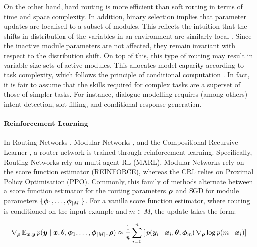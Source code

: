 \documentclass[10pt]{article} %
\begin{document}
On the other hand, hard routing is more efficient than soft routing in terms of time and space complexity. In addition, binary selection implies that parameter updates are localised to a subset of modules. This reflects the intuition that the shifts in distribution of the variables in an environment are similarly local \citep{parascandolo2018learning,goyal2019recurrent}. Since the inactive module parameters are not affected, they remain invariant with respect to the distribution shift.
On top of this, this type of routing may result in variable-size sets of active modules.
This allocates model capacity according to task complexity, which
follows the principle of conditional computation \citep{bengio2015conditional}. In fact, it is fair to assume that the skills required for complex tasks are a superset of those of simpler tasks. For instance, dialogue modelling requires (among others) intent detection, slot filling, and conditional response generation. 

\paragraph*{Reinforcement Learning}
In Routing Networks \citep{rosenbaum2017routing}, Modular Networks \citep{kirsch2018modular}, and the Compositional Recursive Learner \citep[CRL;][]{chang2018automatically}, a router network is trained through reinforcement learning. Specifically, Routing Networks rely on multi-agent RL (MARL), Modular Networks rely on the score function estimator (REINFORCE), whereas the CRL relies on Proximal Policy Optimisation (PPO). Commonly, this family of methods alternate between a score function estimator for the routing parameters ${\bm{\rho}}$ and SGD for module parameters $\{{\bm{\phi}}_1, \dots, {\bm{\phi}}_{|M|}\}$. For a vanilla score function estimator, where routing is conditioned on the input example and $m \in M$, the update takes the form:

\begin{equation}
\begin{aligned}
    \nabla_{\bm{\rho}} \, \mathbb{E}_{{\bm{x}}, {\bm{y}}} \, p({\bm{y}} \mid {\bm{x}}, {\bm{\theta}}, {\bm{\phi}}_1, \dots, {\bm{\phi}}_{|M|}, {\bm{\rho}}) \approx \frac{1}{n} \sum_{i=0}^n \left[ \, p({\bm{y}}_i \mid {\bm{x}}_i, {\bm{\theta}}, {\bm{\phi}}_m) \, \nabla_{\bm{\rho}} \log p(m \mid {\bm{x}}_i) \right]
\end{aligned}
\end{equation}
\end{document}
